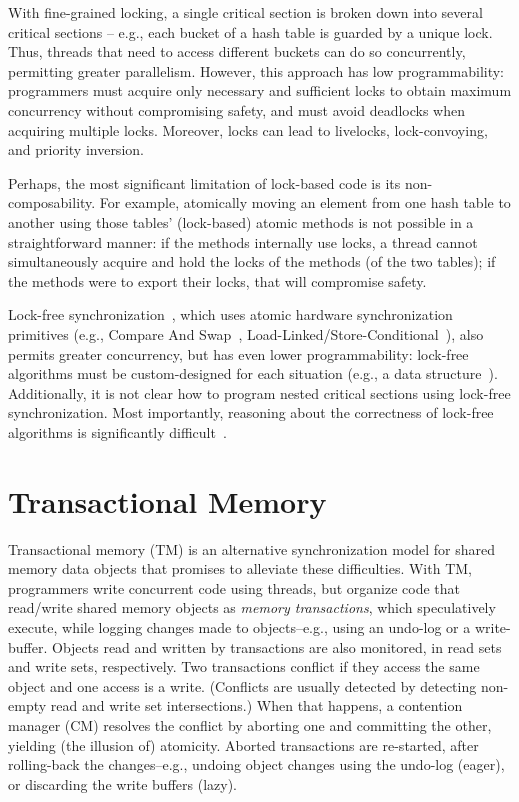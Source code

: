 \documentclass[12pt,english]{report}
\begin{document}
With fine-grained locking, a single critical section is broken down into several critical sections -- e.g., each bucket of a hash table is guarded by a unique lock. Thus, threads that need to access different buckets can do so concurrently, permitting greater parallelism. However, this approach has low programmability: programmers must acquire only necessary and sufficient locks to obtain maximum concurrency without compromising safety, and must avoid deadlocks when acquiring multiple locks. Moreover, locks can lead to livelocks, lock-convoying, and priority inversion. 

Perhaps, the most significant limitation of lock-based code is its non-composability. For example, atomically moving an element from one hash table to another using those tables' (lock-based) atomic methods is not possible in a straightforward manner: if the methods internally use locks, a thread cannot simultaneously acquire and hold the locks of the methods (of the two tables); if the methods were to export their locks, that will compromise safety. 

Lock-free synchronization~\cite{herlihy2008art}, 
which uses atomic hardware synchronization primitives (e.g., Compare And Swap~\cite{CAS64IA32, CASitanium}, Load-Linked/Store-Conditional~\cite{LL:CS:Sites:1993:AAA:151220.151226}),
also permits greater concurrency, but has even lower programmability: lock-free algorithms must be custom-designed for each situation (e.g., a data structure~\cite{lockfreeLLmichael2002high,lockfreeSL,lockfreeBSTfraser2004practical,HopscotchHashing,KarySearchTreesbrown2011non}). Additionally, it is not clear how to program nested critical sections using lock-free synchronization. Most importantly, reasoning about the correctness of lock-free algorithms is significantly difficult~\cite{herlihy2008art}. 

\section{Transactional Memory}

Transactional memory (TM) is an alternative synchronization model for shared memory data objects that promises to alleviate these difficulties.  With TM, programmers write concurrent code using threads, but organize code that read/write shared memory objects as \emph{memory transactions}, which speculatively execute, while logging changes made to objects--e.g., using an undo-log or a write-buffer. Objects read and written by transactions are also monitored, in read sets and write sets, respectively. Two transactions conflict if they access the same object and one access is a write. (Conflicts are usually detected by detecting non-empty read and write set intersections.) When that happens, a contention manager (CM) resolves the conflict by aborting one and committing the other, yielding (the illusion of) atomicity. Aborted transactions are re-started, after rolling-back the changes--e.g., undoing object changes using the undo-log (eager), or discarding the write buffers (lazy). 
\end{document}
